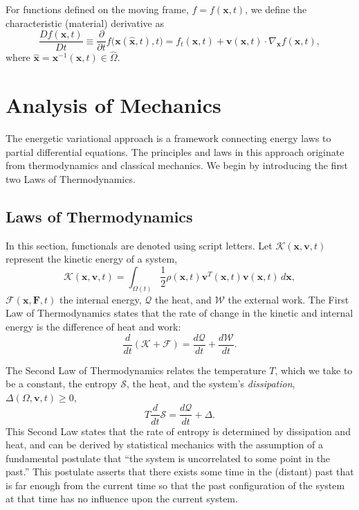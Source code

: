 \documentclass[final,10pt]{article}
\begin{document}
For functions defined on the moving frame, $f = f(\bm x,t)$, we define the characteristic (material) derivative as
\[
	\frac{Df(\bm x, t)}{Dt} \equiv \frac{\partial}{\partial t} f \big( \bm x( \bm{\hat{x}}, t), t \big)
			= f_t(\bm x,t) + \bm v(\bm x,t) \cdot \nabla_{\bm x} f(\bm x,t),
\]
where $\bm{\hat{x}} = \bm x^{-1}(\bm x, t) \in \hat{\Omega}$.


\section{Analysis of Mechanics}

The energetic variational approach is a framework connecting energy laws to partial differential equations.
The principles and laws in this approach originate from thermodynamics and classical mechanics.
We begin by introducing the first two Laws of Thermodynamics.

\subsection{Laws of Thermodynamics}

In this section, functionals are denoted using script letters.
Let $\mathcal K(\bm x,\bm v,t)$ represent the {kinetic energy} of a system, 
\[
	\mathcal K(\bm x,\bm v, t) = \int_{\Omega(t)} \frac12 \rho(\bm x, t) \bm v^T(\bm x,t)\bm v(\bm x,t) \, d\bm x,
\]
$\mathcal F(\bm x,\bm F, t)$ the {internal energy}, $\mathcal Q$ the {heat}, and $\mathcal W$ the external work.
The First Law of Thermodynamics states that the rate of change in the kinetic and internal energy is the difference of heat and work:
\begin{equation} \label{first law of thermodynamics}
	\frac{d}{dt}( \mathcal K+\mathcal F)	=	\frac{d\mathcal Q}{dt} + \frac{d\mathcal W}{dt}.
\end{equation}


The Second Law of Thermodynamics relates the temperature $T$, which we take to be a constant, the {entropy} $\mathcal S$, the heat, and the system's \emph{dissipation}, 
$\Delta(\Omega,\bm v, t) \ge 0$,
\begin{equation} \label{second law of thermodynamics}
	T\frac{d}{dt} \mathcal S	=	\frac{d\mathcal Q}{dt} + \Delta.
\end{equation}
This Second Law states that the rate of entropy is determined by dissipation and heat, and can be derived by statistical mechanics
with the assumption of a {fundamental postulate} that ``the system is uncorrelated to some point in the past.''
This postulate asserts that there exists some time in the (distant) past that is far enough from the current time so that the past configuration
of the system at that time has no influence upon the current system.
\end{document}

